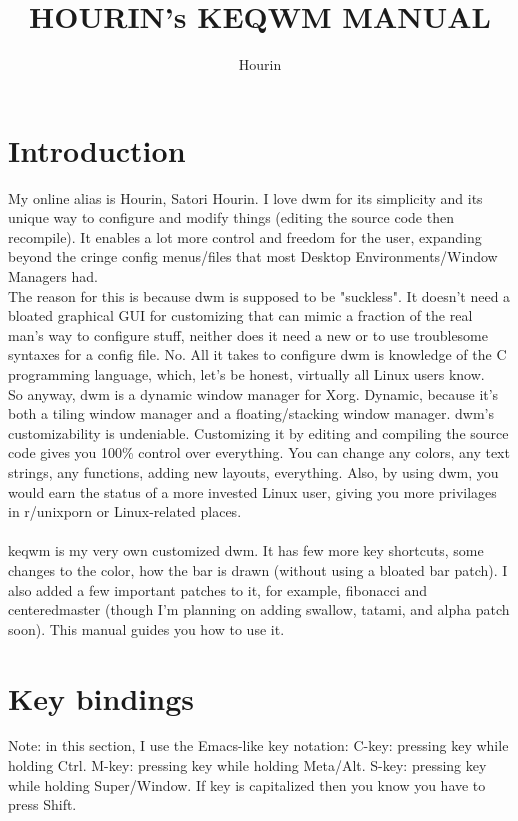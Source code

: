 \documentclass[12pt,letterpaper]{book}
\title{\textbf{HOURIN's KEQWM MANUAL}}
\author{Hourin}
\begin{document}
\maketitle

\section{Introduction}
My online alias is Hourin, Satori Hourin. I love dwm for its simplicity
and its unique way to configure and modify things (editing
the source code then recompile). It enables a lot more control and freedom
for the user, expanding beyond the cringe config menus/files that
most Desktop Environments/Window Managers had. \\
The reason for this is because dwm is supposed to be "suckless". It doesn't need
a bloated graphical GUI for customizing that can mimic a fraction of the
real man's way to configure stuff, neither does it need a new or to use troublesome
syntaxes for a config file. No. All it takes to configure dwm is knowledge of the C
programming language, which, let's be honest, virtually all Linux users know. \\
So anyway, dwm is a dynamic window manager for Xorg. Dynamic, because it's both
a tiling window manager and a floating/stacking window manager. dwm's customizability is
undeniable. Customizing it by editing and compiling the source code gives you 100\% control
over everything. You can change any colors, any text strings, any functions, adding new
layouts, everything. Also, by using dwm, you would earn the status of a more invested Linux
user, giving you more privilages in r/unixporn or Linux-related places. \\
\\
keqwm is my very own customized dwm. It has few more key shortcuts, some changes to the
color, how the bar is drawn (without using a bloated bar patch). I also added a few important
patches to it, for example, fibonacci and centeredmaster (though I'm planning on adding
swallow, tatami, and alpha patch soon). This manual guides you how to use it.

\section{Key bindings}
Note: in this section, I use the Emacs-like key notation:
C-key: pressing key while holding Ctrl.
M-key: pressing key while holding Meta/Alt.
S-key: pressing key while holding Super/Window.
If key is capitalized then you know you have to press Shift.
\end{document}
